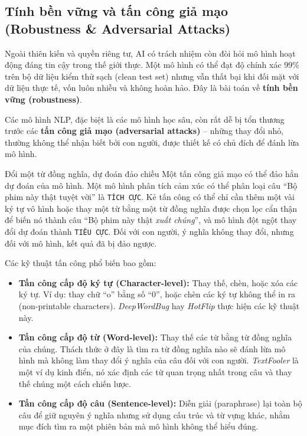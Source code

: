 \subsection{Tính bền vững và tấn công giả mạo (Robustness \& Adversarial Attacks)}
\label{ssec:robustness_adversarial_attacks}

Ngoài thiên kiến và quyền riêng tư, AI có trách nhiệm còn đòi hỏi mô hình hoạt động đáng tin cậy trong thế giới thực. Một mô hình có thể đạt độ chính xác 99\% trên bộ dữ liệu kiểm thử sạch (clean test set) nhưng vẫn thất bại khi đối mặt với dữ liệu thực tế, vốn luôn nhiễu và không hoàn hảo. Đây là bài toán về \textbf{tính bền vững (robustness)}.

Các mô hình NLP, đặc biệt là các mô hình học sâu, còn rất dễ bị tổn thương trước các \textbf{tấn công giả mạo (adversarial attacks)} -- những thay đổi nhỏ, thường không thể nhận biết bởi con người, được thiết kế có chủ đích để đánh lừa mô hình.

\begin{deepdive}{Đổi một từ đồng nghĩa, dự đoán đảo chiều}
Một tấn công giả mạo có thể đảo hẳn dự đoán của mô hình. Một mô hình phân tích cảm xúc có thể phân loại câu “Bộ phim này thật tuyệt vời” là \texttt{TÍCH CỰC}. Kẻ tấn công có thể chỉ cần thêm một vài ký tự vô hình hoặc thay một từ bằng một từ đồng nghĩa được chọn lọc cẩn thận để biến nó thành câu “Bộ phim này thật \textit{xuất chúng}”, và mô hình đột ngột thay đổi dự đoán thành \texttt{TIÊU CỰC}. Đối với con người, ý nghĩa không thay đổi, nhưng đối với mô hình, kết quả đã bị đảo ngược.
\end{deepdive}

Các kỹ thuật tấn công phổ biến bao gồm:
\begin{itemize}
    \item \textbf{Tấn công cấp độ ký tự (Character-level):} Thay thế, chèn, hoặc xóa các ký tự. Ví dụ: thay chữ “o” bằng số “0”, hoặc chèn các ký tự không thể in ra (non-printable characters). \textit{DeepWordBug} \cite{gao2018black} hay \textit{HotFlip} \cite{ebrahimi2017hotflip} thực hiện các kỹ thuật này.
    \item \textbf{Tấn công cấp độ từ (Word-level):} Thay thế các từ bằng từ đồng nghĩa của chúng. Thách thức ở đây là tìm ra từ đồng nghĩa nào sẽ đánh lừa mô hình mà không làm thay đổi ý nghĩa của câu đối với con người. \textit{TextFooler} \cite{jin2020bert} là một ví dụ kinh điển, nó xác định các từ quan trọng nhất trong câu và thay thế chúng một cách chiến lược.
    \item \textbf{Tấn công cấp độ câu (Sentence-level):} Diễn giải (paraphrase) lại toàn bộ câu để giữ nguyên ý nghĩa nhưng sử dụng cấu trúc và từ vựng khác, nhằm mục đích tìm ra một phiên bản mà mô hình không thể hiểu đúng.
\end{itemize}

